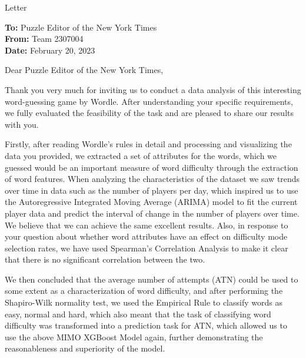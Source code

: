 \documentclass[12pt]{article}  %
\begin{document}
\begin{letter}{Letter}
    \begin{flushleft}  %
    \textbf{To:} Puzzle Editor of the New York Times\\
    \textbf{From:} Team 2307004\\
    \textbf{Date:} February 20, 2023\\
    \end{flushleft}
    Dear Puzzle Editor of the New York Times, 
    
    Thank you very much for inviting us to conduct a data analysis of this interesting word-guessing game by Wordle. After understanding your specific requirements, we fully evaluated the feasibility of the task and are pleased to share our results with you.
    
    Firstly, after reading Wordle's rules in detail and processing and visualizing the data you provided, we extracted a set of attributes for the words, which we guessed would be an important measure of word difficulty through the extraction of word features. When analyzing the characteristics of the dataset we saw trends over time in data such as the number of players per day, which inspired us to use the Autoregressive Integrated Moving Average (ARIMA) model to fit the current player data and predict the interval of change in the number of players over time. We believe that we can achieve the same excellent results. Also, in response to your question about whether word attributes have an effect on difficulty mode selection rates, we have used Spearman's Correlation Analysis to make it clear that there is no significant correlation between the two.
    
    We then concluded that the average number of attempts (ATN) could be used to some extent as a characterization of word difficulty, and after performing the Shapiro-Wilk normality test, we used the Empirical Rule to classify words as easy, normal and hard, which also meant that the task of classifying word difficulty was transformed into a prediction task for ATN, which allowed us to use the above MIMO XGBoost Model again, further demonstrating the reasonableness and superiority of the model.
    

\end{letter}
\end{document}
